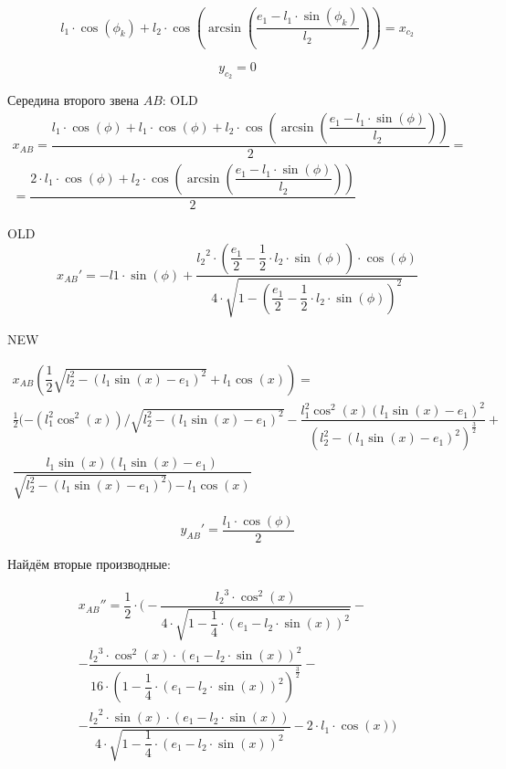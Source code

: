 \begin{equation}\label{eq:xc2}
	l_1\cdot\cos(\phi_k)+l_2\cdot\cos\left(\arcsin\left(\dfrac{e_1-l_1\cdot\sin(\phi_k)}{l_2}\right)\right)=x_{c_2}
\end{equation}

\begin{equation}\label{eq:yc2}
	y_{c_2}=0
\end{equation}

\newpage


\newpage
Середина второго звена $ AB $:
OLD
\begin{multline}\label{eq:xl2}
	x_{AB}=\dfrac{l_1\cdot\cos(\phi) + 	l_1\cdot\cos(\phi)+l_2\cdot\cos\left(\arcsin\left(\dfrac{e_1-l_1\cdot\sin(\phi)}{l_2}\right)\right)}{2}=\\
	=\dfrac{2\cdot l_1\cdot\cos(\phi)+l_2\cdot\cos\left(\arcsin\left(\dfrac{e_1-l_1\cdot\sin(\phi)}{l_2}\right)\right)}{2}
\end{multline}


OLD
\begin{equation}\label{eq:xABdphi}
	x_{AB}'=-l1\cdot\sin(\phi)+
	\dfrac{{l_2}^{2}\cdot \left(\dfrac{e_1}{2}-\dfrac{1}{2}\cdot l_2\cdot\sin(\phi) \right)\cdot\cos(\phi)}{4\cdot \sqrt{1-{\left(\dfrac{e_1}{2}-\dfrac{1}{2}\cdot l_2\cdot \sin(\phi) \right)}^{2}}}
\end{equation}

NEW

\begin{multline}
x_{AB}(\dfrac{1}{2} \sqrt{l_{2}^{2} - (l_1\sin(x) - e_1)^2} + l_1 \cos(x)) =\\ \frac{1}{2} (-(l_1^2 \cos^2(x))/\sqrt{l_2^2 - (l_1 \sin(x) - e_1)^2} - \dfrac{l_1^2 \cos^2(x) (l_1 \sin(x) - e_1)^2}{(l_2^2 - (l_1 \sin(x) - e_1)^2)^{\frac{3}{2}}} +\\ \dfrac{l_1 \sin(x) (l_1 \sin(x) - e_1)}{\sqrt{l_2^2 - (l_1 \sin(x) - e_1)^2}) - l_1 \cos(x)}
\end{multline}

\newpage
\begin{equation}\label{eq:yABdphi}
	y_{AB}'=\dfrac{l_1\cdot\cos(\phi)}{2}
\end{equation}

Найдём вторые производные:

\begin{eqnarray}\label{eq:xABdphi2}
	x_{AB}''=\dfrac{1}{2}\cdot\Bigg(-\dfrac{{l_2}^{3}\cdot\cos^{2}(x)}{4\cdot\sqrt{1-\dfrac{1}{4}\cdot\left(e_1-l_2\cdot\sin(x)\right)^{2}}}-\\
	-\dfrac{{l_2}^{3}\cdot\cos^{2}(x)\cdot\left(e_1-l_2\cdot\sin(x)\right)^{2} }{16\cdot\left(1-\dfrac{1}{4}\cdot\left(e_1-l_2\cdot\sin(x)\right)^{2}\right)^{\frac{3}{2}}}-\\
	-\dfrac{{l_2}^{2}\cdot\sin(x)\cdot\left(e_1-l_2\cdot\sin(x)\right)}{4\cdot\sqrt{1-\dfrac{1}{4}\cdot\left(e_1-l_2\cdot\sin(x)\right)^{2}}}-2\cdot l_1\cdot\cos(x)\Bigg)
\end{eqnarray}

